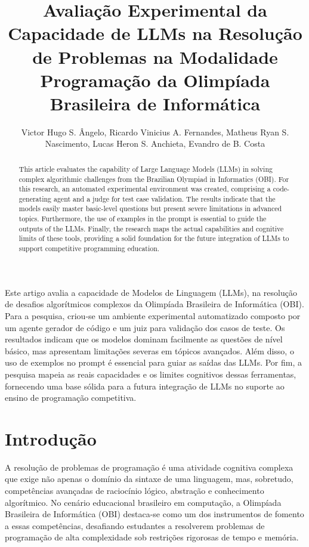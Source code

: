 \documentclass[12pt]{article}
\title{Avaliação Experimental da Capacidade de LLMs na Resolução de Problemas na Modalidade Programação da Olimpíada Brasileira de Informática}
\author{Victor Hugo S. Ângelo\inst{1}, Ricardo Vinicius A. Fernandes\inst{1}, Matheus Ryan S. Nascimento\inst{1}, Lucas Heron S. Anchieta\inst{1}, Evandro de B. Costa\inst{1}}
\begin{document}
\maketitle

\begin{abstract}
This article evaluates the capability of Large Language Models (LLMs) in solving complex algorithmic challenges from the Brazilian Olympiad in Informatics (OBI). For this research, an automated experimental environment was created, comprising a code-generating agent and a judge for test case validation. The results indicate that the models easily master basic-level questions but present severe limitations in advanced topics. Furthermore, the use of examples in the prompt is essential to guide the outputs of the LLMs. Finally, the research maps the actual capabilities and cognitive limits of these tools, providing a solid foundation for the future integration of LLMs to support competitive programming education.
\end{abstract}
     
\begin{resumo}
Este artigo avalia a capacidade de Modelos de Linguagem (LLMs), na resolução de desafios algorítmicos complexos da Olimpíada Brasileira de Informática (OBI). Para a pesquisa, criou-se um ambiente experimental automatizado composto por um agente gerador de código e um juiz para validação dos casos de teste. Os resultados indicam que os modelos dominam facilmente as questões de nível básico, mas apresentam limitações severas em tópicos avançados. Além disso, o uso de exemplos no prompt é essencial para guiar as saídas das LLMs. Por fim, a pesquisa mapeia as reais capacidades e os limites cognitivos dessas ferramentas, fornecendo uma base sólida para a futura integração de LLMs no suporte ao ensino de programação competitiva.
\end{resumo}

\section{Introdução}

A resolução de problemas de programação é uma atividade cognitiva complexa que exige não apenas o domínio da sintaxe de uma linguagem, mas, sobretudo, competências avançadas de raciocínio lógico, abstração e conhecimento algorítmico. No cenário educacional brasileiro em computação, a Olimpíada Brasileira de Informática (OBI) destaca-se como um dos instrumentos de fomento a essas competências, desafiando estudantes a resolverem problemas de programação de alta complexidade sob restrições rigorosas de tempo e memória.
\end{document}
